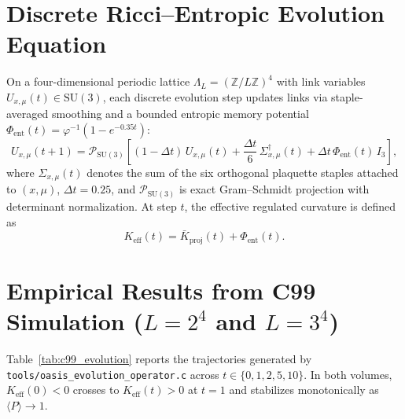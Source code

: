 \documentclass[11pt,a4paper]{article}
\begin{document}
\section{Discrete Ricci--Entropic Evolution Equation}
On a four-dimensional periodic lattice $\Lambda_L = (\mathbb{Z}/L\mathbb{Z})^4$ with link variables $U_{x,\mu}(t) \in \mathrm{SU}(3)$, each discrete evolution step updates links via staple-averaged smoothing and a bounded entropic memory potential $\Phi_{\mathrm{ent}}(t) = \varphi^{-1}(1 - e^{-0.35 t})$:
\[
U_{x,\mu}(t+1) = \mathcal{P}_{\mathrm{SU}(3)}\!\left[(1 - \Delta t)\,U_{x,\mu}(t) + \frac{\Delta t}{6}\,\Sigma_{x,\mu}^\dagger(t) + \Delta t\,\Phi_{\mathrm{ent}}(t)\,I_3\right],
\]
where $\Sigma_{x,\mu}(t)$ denotes the sum of the six orthogonal plaquette staples attached to $(x,\mu)$, $\Delta t = 0.25$, and $\mathcal{P}_{\mathrm{SU}(3)}$ is exact Gram--Schmidt projection with determinant normalization. At step $t$, the effective regulated curvature is defined as
\[
K_{\mathrm{eff}}(t) = \bar{K}_{\mathrm{proj}}(t) + \Phi_{\mathrm{ent}}(t).
\]

\section{Empirical Results from C99 Simulation ($L=2^4$ and $L=3^4$)}
Table~\ref{tab:c99_evolution} reports the trajectories generated by \texttt{tools/oasis\_evolution\_operator.c} across $t \in \{0, 1, 2, 5, 10\}$. In both volumes, $K_{\mathrm{eff}}(0) < 0$ crosses to $K_{\mathrm{eff}}(t) > 0$ at $t=1$ and stabilizes monotonically as $\langle P \rangle \to 1$.
\end{document}
